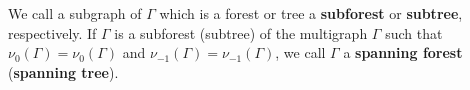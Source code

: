 We call a subgraph of $\Gamma$ which is a forest or tree a \textbf{subforest} or \textbf{subtree}, respectively. If $\Gamma$ is a subforest (subtree) of the multigraph $\Gamma$ such that $\nu_0(\Gamma) = \nu_0(\Gamma)$ and $\nu_{-1}(\Gamma) = \nu_{-1}(\Gamma)$, we call $\Gamma$ a \textbf{spanning forest} (\textbf{spanning tree}).